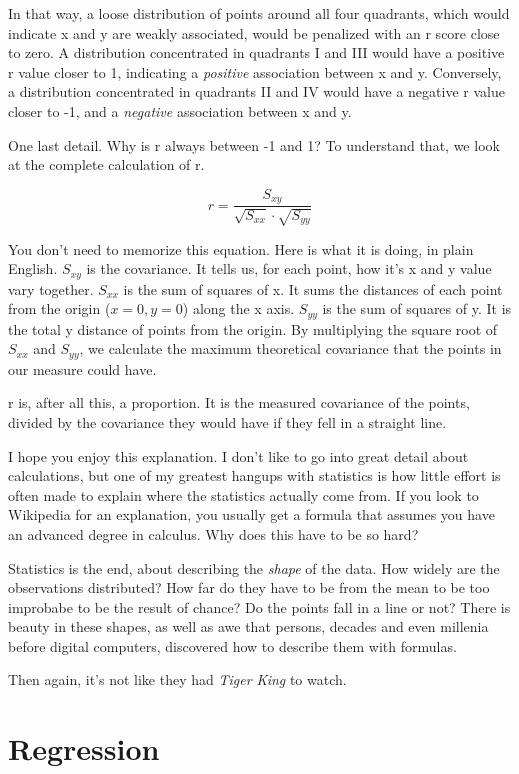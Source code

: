 \documentclass[
]{book}
\begin{document}
In that way, a loose distribution of points around all four quadrants, which would indicate x and y are weakly associated, would be penalized with an r score close to zero. A distribution concentrated in quadrants I and III would have a positive r value closer to 1, indicating a \emph{positive} association between x and y. Conversely, a distribution concentrated in quadrants II and IV would have a negative r value closer to -1, and a \emph{negative} association between x and y.

One last detail. Why is r always between -1 and 1? To understand that, we look at the complete calculation of r.

\[r=\frac{S_{xy}}{\sqrt{S_{xx}}\cdot\sqrt{S_{yy}}} \]

You don't need to memorize this equation. Here is what it is doing, in plain English. \(S_{xy}\) is the covariance. It tells us, for each point, how it's x and y value vary together. \(S_{xx}\) is the sum of squares of x. It sums the distances of each point from the origin (\(x=0,y=0\)) along the x axis. \(S_{yy}\) is the sum of squares of y. It is the total y distance of points from the origin. By multiplying the square root of \(S_{xx}\) and \(S_{yy}\), we calculate the maximum theoretical covariance that the points in our measure could have.

r is, after all this, a proportion. It is the measured covariance of the points, divided by the covariance they would have if they fell in a straight line.

I hope you enjoy this explanation. I don't like to go into great detail about calculations, but one of my greatest hangups with statistics is how little effort is often made to explain where the statistics actually come from. If you look to Wikipedia for an explanation, you usually get a formula that assumes you have an advanced degree in calculus. Why does this have to be so hard?

Statistics is the end, about describing the \emph{shape} of the data. How widely are the observations distributed? How far do they have to be from the mean to be too improbabe to be the result of chance? Do the points fall in a line or not? There is beauty in these shapes, as well as awe that persons, decades and even millenia before digital computers, discovered how to describe them with formulas.

Then again, it's not like they had \emph{Tiger King} to watch.

\hypertarget{regression}{%
\section{Regression}\label{regression}}
\end{document}
